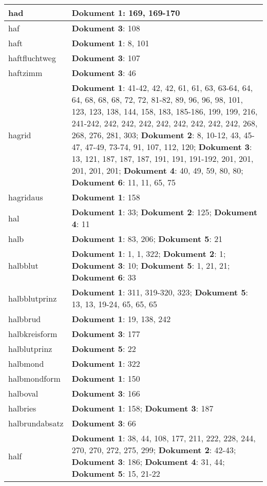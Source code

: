 \documentclass[a5paper]{article}
\begin{document}
\begin{longtable}[l]{|l|p{3in}|}
\hline
had & \textbf{Dokument 1}: 169, 169-170 \\
\hline
haf & \textbf{Dokument 3}: 108 \\
\hline
haft & \textbf{Dokument 1}: 8, 101 \\
\hline
haftfluchtweg & \textbf{Dokument 3}: 107 \\
\hline
haftzimm & \textbf{Dokument 3}: 46 \\
\hline
hagrid & \textbf{Dokument 1}: 41-42, 42, 42, 61, 61, 63, 63-64, 64, 64, 68, 68, 68, 72, 72, 81-82, 89, 96, 96, 98, 101, 123, 123, 138, 144, 158, 183, 185-186, 199, 199, 216, 241-242, 242, 242, 242, 242, 242, 242, 242, 242, 268, 268, 276, 281, 303; \textbf{Dokument 2}: 8, 10-12, 43, 45-47, 47-49, 73-74, 91, 107, 112, 120; \textbf{Dokument 3}: 13, 121, 187, 187, 187, 191, 191, 191-192, 201, 201, 201, 201, 201; \textbf{Dokument 4}: 40, 49, 59, 80, 80; \textbf{Dokument 6}: 11, 11, 65, 75 \\
\hline
hagridaus & \textbf{Dokument 1}: 158 \\
\hline
hal & \textbf{Dokument 1}: 33; \textbf{Dokument 2}: 125; \textbf{Dokument 4}: 11 \\
\hline
halb & \textbf{Dokument 1}: 83, 206; \textbf{Dokument 5}: 21 \\
\hline
halbblut & \textbf{Dokument 1}: 1, 1, 322; \textbf{Dokument 2}: 1; \textbf{Dokument 3}: 10; \textbf{Dokument 5}: 1, 21, 21; \textbf{Dokument 6}: 33 \\
\hline
halbblutprinz & \textbf{Dokument 1}: 311, 319-320, 323; \textbf{Dokument 5}: 13, 13, 19-24, 65, 65, 65 \\
\hline
halbbrud & \textbf{Dokument 1}: 19, 138, 242 \\
\hline
halbkreisform & \textbf{Dokument 3}: 177 \\
\hline
halblutprinz & \textbf{Dokument 5}: 22 \\
\hline
halbmond & \textbf{Dokument 1}: 322 \\
\hline
halbmondform & \textbf{Dokument 1}: 150 \\
\hline
halboval & \textbf{Dokument 3}: 166 \\
\hline
halbries & \textbf{Dokument 1}: 158; \textbf{Dokument 3}: 187 \\
\hline
halbrundabsatz & \textbf{Dokument 3}: 66 \\
\hline
half & \textbf{Dokument 1}: 38, 44, 108, 177, 211, 222, 228, 244, 270, 270, 272, 275, 299; \textbf{Dokument 2}: 42-43; \textbf{Dokument 3}: 186; \textbf{Dokument 4}: 31, 44; \textbf{Dokument 5}: 15, 21-22 \\

\end{longtable}
\end{document}
